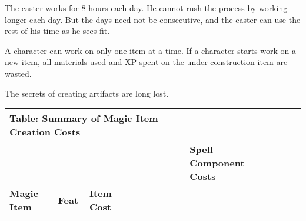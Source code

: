 The caster works for 8 hours each day. He cannot rush the process by working longer 
each day. But the days need not be consecutive, and the caster can use the rest 
of his time as he sees fit.

A character can work on only one item at a time. If a character starts work on 
a new item, all materials used and XP spent on the under-construction item are 
wasted.

The secrets of creating artifacts are long lost.

\vspace{12pt}
\begin{longtable}{llllllllllllll}
\hline
\multicolumn{7}{|p{4.224in}|}{\begin{minipage}[t]{4.224in}\raggedright
\textbf{Table: Summary of Magic Item Creation Costs}\end{minipage}}\\
\hline
\multicolumn{7}{p{0.276in}|}{\begin{minipage}[t]{0.276in}\raggedright
\textbf{ }\end{minipage}} & \multicolumn{1}{|p{0.472in}|}{\begin{minipage}[t]{0.472in}\raggedright
\textbf{ }\end{minipage}} & \multicolumn{1}{p{0.639in}|}{\begin{minipage}[t]{0.639in}\raggedright
\textbf{ }\end{minipage}} & \multicolumn{1}{p{0.497in}|}{\begin{minipage}[t]{0.497in}\centering
\textbf{Spell Component Costs}\end{minipage}} & \multicolumn{2}{p{1.108in}|}{\begin{minipage}[t]{1.108in}\centering
\end{minipage}} & \multicolumn{1}{p{0.739in}|}{\begin{minipage}[t]{0.739in}\raggedright
\end{minipage}}\\
\hline
\multicolumn{1}{p{0.768in}|}{\begin{minipage}[t]{0.768in}\centering
\textbf{Magic Item }\end{minipage}} & \multicolumn{1}{p{0.039in}|}{\begin{minipage}[t]{0.039in}\raggedright
\textbf{Feat }\end{minipage}} & \multicolumn{1}{p{0.039in}|}{\begin{minipage}[t]{0.039in}\raggedright
\textbf{Item Cost }\end{minipage}} & \multicolumn{1}{p{0.039in}|}{\begin{minipage}[t]{0.039in}\raggedright

\end{minipage}}
\end{longtable}
